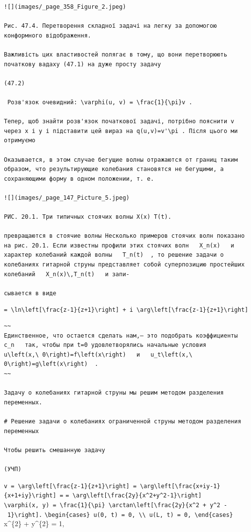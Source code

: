 \documentclass[
  ukrainian,
]{article}
\begin{document}
\begin{verbatim}
![](images/_page_358_Figure_2.jpeg)

Рис. 47.4. Перетворення складної задачі на легку за допомогою конформного відображення.

Важливість цих властивостей полягає в тому, що вони перетворюють початкову вадаху (47.1) на дуже просту задачу

(47.2)

 Розв'язок очевидний: \varphi(u, v) = \frac{1}{\pi}v .

Тепер, щоб знайти розв'язок початкової задачі, потрібно пояснити v через x і y і підставити цей вираз на q(u,v)=v'\pi . Після цього ми отримуємо

Оказывается, в этом случае бегущие волны отражаются от границ таким образом, что результирующие колебания становятся не бегущими, а сохраняющими форму в одном положении, т. е.

![](images/_page_147_Picture_5.jpeg)

РИС. 20.1. Три типичных стоячих волны X(x) T(t).

превращаются в стоячие волны Несколько примеров стоячих волн показано на рис. 20.1. Если известны профили этих стоячих волн   X_n(x)   и характер колебаний каждой волны   T_n(t)  , то решение задачи о колебаниях гитарной струны представляет собой суперпозицию простейших колебаний   X_n(x)\,T_n(t)   и запи-

сывается в виде
\end{verbatim}

\texttt{=\ \textbackslash{}ln\textbackslash{}left{[}\textbackslash{}frac\{z-1\}\{z+1\}\textbackslash{}right{]}\ +\ i\ \textbackslash{}arg\textbackslash{}left{[}\textbackslash{}frac\{z-1\}\{z+1\}\textbackslash{}right{]}}

\begin{verbatim}
~~
Единственное, что остается сделать нам,— это подобрать коэффициенты   c_n   так, чтобы при t=0 удовлетворялись начальные условия   u\left(x,\ 0\right)=f\left(x\right)   и   u_t\left(x,\ 0\right)=g\left(x\right)  .
~~

Задачу о колебаниях гитарной струны мы решим методом разделения переменных.

# Решение задачи о колебаниях ограниченной струны методом разделения переменных

Чтобы решить смешанную задачу

(УЧП)
\end{verbatim}

\texttt{v\ =\ \textbackslash{}arg\textbackslash{}left{[}\textbackslash{}frac\{z-1\}\{z+1\}\textbackslash{}right{]}\ =\ \textbackslash{}arg\textbackslash{}left{[}\textbackslash{}frac\{x+iy-1\}\{x+1+iy\}\textbackslash{}right{]}\ =}
\texttt{=\ \textbackslash{}arg\textbackslash{}left{[}\textbackslash{}frac\{2y\}\{x\^{}2+y\^{}2-1\}\textbackslash{}right{]}}
\texttt{\textbackslash{}varphi(x,\ y)\ =\ \textbackslash{}frac\{1\}\{\textbackslash{}pi\}\ \textbackslash{}arctan\textbackslash{}left{[}\textbackslash{}frac\{2y\}\{x\^{}2\ +\ y\^{}2\ -\ 1\}\textbackslash{}right{]}.}
\texttt{\textbackslash{}begin\{cases\}\ u(0,\ t)\ =\ 0,\ \textbackslash{}\textbackslash{}\ u(L,\ t)\ =\ 0,\ \textbackslash{}end\{cases\}}
x\^{}\{2\} + y\^{}\{2\} = 1,
\end{document}

